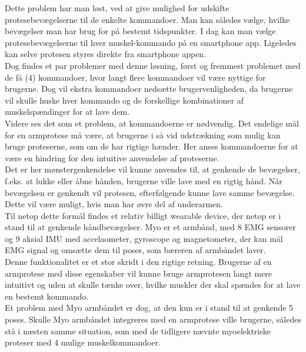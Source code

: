 Dette problem har man løst, ved at give mulighed for udskifte protesebevægelserne til de enkelte kommandoer. Man kan således vælge, hvilke bevægelser man har brug for på bestemt tidspunkter. I dag kan man vælge protesebevægelserne til hver muskel-kommando på en smartphone app. Ligeledes kan selve protesen styres direkte fra smartphone appen.
\\
Dog findes et par problemer med denne løsning, først og fremmest problemet med de få (4) kommandoer, hvor langt flere kommandoer vil være nyttige for brugerne. Dog vil ekstra kommandoer nedsætte brugervenligheden, da brugerne vil skulle huske hver kommando og de forskellige kombinationer af muskelspændinger for at lave dem.\\

Videre ses det som et problem, at kommandoerne er nødvendig. Det endelige mål for en armprotese må være, at brugerne i så vid udstrækning som mulig kan bruge proteserne, som om de har rigtige hænder. Her anses kommandoerne for at være en hindring for den intuitive anvendelse af proteserne.\\

Det er her mønstergenkendelse vil kunne anvendes til, at genkende de bevægelser, f.eks. at lukke eller åbne hånden, brugerne ville lave med en rigtig hånd. Når bevægelsen er genkendt vil protesen, efterfølgende kunne lave samme bevægelse. Dette vil være muligt, hvis man har øvre del af underarmen. \\

Til netop dette formål findes et relativ billigt wearable device, der netop er i stand til at genkende håndbevægelser. Myo er et armbånd, med 8 EMG sensorer og 9 aksial IMU med accelaometer, gyroscope og magnetometer, der kan mål EMG signal og omsætte dem til poses, som bæreren af armbåndet laver. \\
Denne funktionalitet er et stor skridt i den rigtige retning. Brugerne af en armprotese med disse egenskaber vil kunne bruge armprotesen langt mere intuitivt og uden at skulle tænke over, hvilke muskler der skal spændes for at lave en bestemt kommando.\\
Et problem med Myo armbåndet er dog, at den kun er i stand til at genkende 5 poses. Skulle Myo armbåndet integreres med en armprotese ville brugerne, således stå i næsten samme situation, som med de tidligere nævnte myoelektriske proteser med 4 mulige muskelkommandoer.\\

